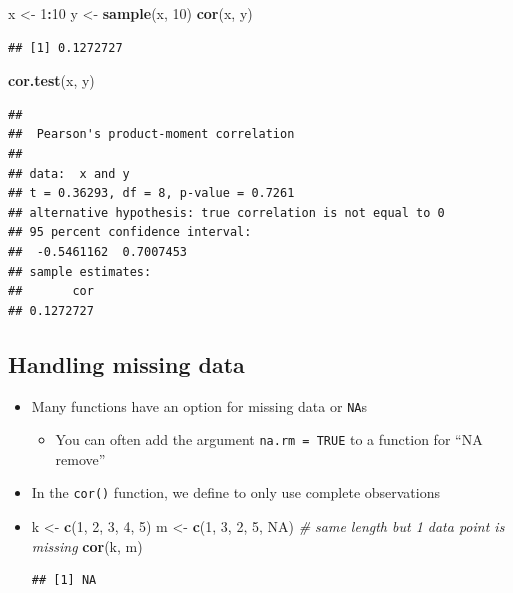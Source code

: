 \documentclass[
]{book}
\newenvironment{Shaded}{\begin{snugshade}}{\end{snugshade}}
\newcommand{\CommentTok}[1]{\textcolor[rgb]{0.56,0.35,0.01}{\textit{#1}}}
\newcommand{\ConstantTok}[1]{\textcolor[rgb]{0.56,0.35,0.01}{#1}}
\newcommand{\DecValTok}[1]{\textcolor[rgb]{0.00,0.00,0.81}{#1}}
\newcommand{\FunctionTok}[1]{\textcolor[rgb]{0.13,0.29,0.53}{\textbf{#1}}}
\newcommand{\NormalTok}[1]{#1}
\newcommand{\OtherTok}[1]{\textcolor[rgb]{0.56,0.35,0.01}{#1}}
\newcommand{\SpecialCharTok}[1]{\textcolor[rgb]{0.81,0.36,0.00}{\textbf{#1}}}
\providecommand{\tightlist}{%
  \setlength{\itemsep}{0pt}\setlength{\parskip}{0pt}}
\begin{document}
\begin{Shaded}
\begin{Highlighting}[]
\NormalTok{x }\OtherTok{\textless{}{-}} \DecValTok{1}\SpecialCharTok{:}\DecValTok{10} 
\NormalTok{y }\OtherTok{\textless{}{-}} \FunctionTok{sample}\NormalTok{(x, }\DecValTok{10}\NormalTok{)}
\FunctionTok{cor}\NormalTok{(x, y)}
\end{Highlighting}
\end{Shaded}

\begin{verbatim}
## [1] 0.1272727
\end{verbatim}

\begin{Shaded}
\begin{Highlighting}[]
\FunctionTok{cor.test}\NormalTok{(x, y)}
\end{Highlighting}
\end{Shaded}

\begin{verbatim}
## 
##  Pearson's product-moment correlation
## 
## data:  x and y
## t = 0.36293, df = 8, p-value = 0.7261
## alternative hypothesis: true correlation is not equal to 0
## 95 percent confidence interval:
##  -0.5461162  0.7007453
## sample estimates:
##       cor 
## 0.1272727
\end{verbatim}

\subsection{Handling missing data}\label{handling-missing-data}

\begin{itemize}
\item
  Many functions have an option for missing data or \texttt{NA}s

  \begin{itemize}
  \tightlist
  \item
    You can often add the argument \texttt{na.rm\ =\ TRUE} to a function for ``NA remove''
  \end{itemize}
\item
  In the \texttt{cor()} function, we define to only use complete observations
\item
\begin{Shaded}
\begin{Highlighting}[]
\NormalTok{k }\OtherTok{\textless{}{-}} \FunctionTok{c}\NormalTok{(}\DecValTok{1}\NormalTok{, }\DecValTok{2}\NormalTok{, }\DecValTok{3}\NormalTok{, }\DecValTok{4}\NormalTok{, }\DecValTok{5}\NormalTok{)}
\NormalTok{m }\OtherTok{\textless{}{-}} \FunctionTok{c}\NormalTok{(}\DecValTok{1}\NormalTok{, }\DecValTok{3}\NormalTok{, }\DecValTok{2}\NormalTok{, }\DecValTok{5}\NormalTok{, }\ConstantTok{NA}\NormalTok{) }\CommentTok{\# same length but 1 data point is missing}
\FunctionTok{cor}\NormalTok{(k, m)}
\end{Highlighting}
\end{Shaded}

\begin{verbatim}
## [1] NA
\end{verbatim}
\end{itemize}
\end{document}
